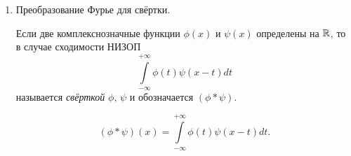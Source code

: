 \documentclass[../../main.tex]{subfiles}
\newcommand{\intii}{\int\limits_{-\infty}^{+\infty}}
\begin{document}
\begin{enumerate}
\begin{proof}
    Т.~к. производная $f'$ абсолютно интегрируема, то тем самым получаем, что 
    \[\exists p = \lim_{x \to \infty} f(x) \stackrel{\eqref{lec21:28}}{=} 
    \lim_{x \to \infty}\left(f(0) 
    + \int\limits_{0}^{x}f'(t)dt \right) \in \R.\]
    Покажем, что $p = 0$. Если предположить, что, например, $p >0$, то для 
    всех 
    достаточно больших $x \in \R \implies |f(x)| \geq \frac p2$, а тогда 
    $\intii |f(x)|dx$ расходится по признаку сравнения. Поэтому $|p| = 0 
    \implies p = 0$.
    Таким образом,
    \[ \lim_{x \to +\infty} f(x) = 0.\]
    Аналогично доказывается, что
    \[ \lim_{x \to -\infty} f(x) = 0.\]
    Отсюда, в силу формулы интегрирования по частям, получаем
    \begin{multline*}
      F[f'](y) = \frac{1}{\sqrt{2\pi}} \intii f'(t)e^{ity}dt = 
      \frac{1}{\sqrt{2\pi}} \intii e^{iyt}d(f(t)) =\\= \frac{1}{\sqrt{2\pi}} 
      \left(f(t) e^{iyt}\bigg|_{t = -\infty}^{t = +\infty} \right) - 
      \frac{1}{\sqrt{2\pi}} \intii f(t)f(e^{iyt}) = -iyF(y).
    \end{multline*}
  \end{proof}
  
  \item Преобразование Фурье для свёртки.
  
  Если две комплекснозначные функции $\phi(x)$ и $\psi(x)$ определены 
  на $\mathbb{R}$, то в случае сходимости НИЗОП
  \[ \intii \phi(t)\psi(x - t)dt \]
  называется \emph{свёрткой} $\phi, \, \psi$ и обозначается $(\phi * \psi)$.
  
  \begin{equation}
    \label{lec21:29}
    (\phi * \psi)(x) = \intii \phi(t)\psi(x - t)dt.
  \end{equation}
\end{enumerate}
\end{document}

